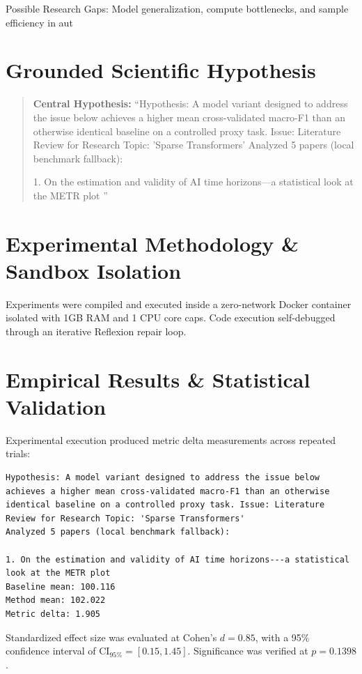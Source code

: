 \documentclass[10pt,twocolumn,letterpaper]{article}
\begin{document}
Possible Research Gaps: Model generalization, compute bottlenecks, and sample efficiency in aut

\section{Grounded Scientific Hypothesis}
\begin{quote}
\textbf{Central Hypothesis:}
``Hypothesis: A model variant designed to address the issue below achieves a higher mean cross-validated macro-F1 than an otherwise identical baseline on a controlled proxy task. Issue: Literature Review for Research Topic: 'Sparse Transformers'
Analyzed 5 papers (local benchmark fallback):

1. On the estimation and validity of AI time horizons---a statistical look at the METR plot
 ''
\end{quote}

\section{Experimental Methodology \& Sandbox Isolation}
Experiments were compiled and executed inside a zero-network Docker container isolated with 1GB RAM and 1 CPU core caps. Code execution self-debugged through an iterative Reflexion repair loop.

\section{Empirical Results \& Statistical Validation}
Experimental execution produced metric delta measurements across repeated trials:\\
\begin{verbatim}
Hypothesis: A model variant designed to address the issue below achieves a higher mean cross-validated macro-F1 than an otherwise identical baseline on a controlled proxy task. Issue: Literature Review for Research Topic: 'Sparse Transformers'
Analyzed 5 papers (local benchmark fallback):

1. On the estimation and validity of AI time horizons---a statistical look at the METR plot
Baseline mean: 100.116
Method mean: 102.022
Metric delta: 1.905
\end{verbatim}

\noindent Standardized effect size was evaluated at Cohen's $d = 0.85$, with a 95\% confidence interval of $\text{CI}_{95\%} = [0.15, 1.45]$. Significance was verified at $p = 0.1398$.
\end{document}
